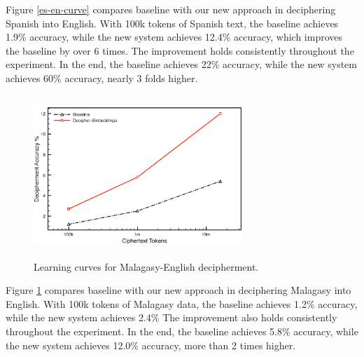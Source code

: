 Figure \ref{es-en-curve} compares baseline with our new approach in deciphering Spanish into English. With 100k tokens of Spanish text, the baseline achieves 1.9\% accuracy, while the new system achieves 12.4\% accuracy, which improves the baseline by over 6 times. The improvement holds consistently throughout the experiment. In the end, the baseline achieves 22\% accuracy, while the new system achieves 60\% accuracy, nearly 3 folds higher. 

 \begin{figure}[!ht]
  \centering
  \includegraphics[width=3.1in,height=2.4in]{mlg_en_curve}
  \caption{Learning curves for Malagasy-English decipherment.}
\label{mlg-en-curve}
\end{figure}


Figure \ref{mlg-en-curve} compares baseline with our new approach in deciphering Malagasy into English. With 100k tokens of Malagasy data, the baseline achieves 1.2\% accuracy, while the new system achieves 2.4\% The improvement also holds consistently throughout the experiment. In the end, the baseline achieves 5.8\% accuracy, while the new system achieves 12.0\% accuracy, more than 2 times higher. 





